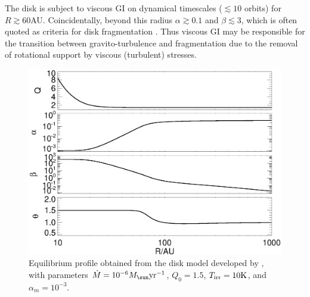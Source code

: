 The disk is subject to viscous GI on dynamical timescales ($\lesssim
10$ orbits) for $R\gtrsim60$AU. Coincidentally, beyond this radius
$\alpha\gtrsim 0.1$ and $\beta\lesssim 3$, which is often quoted as 
criteria for disk fragmentation \citep[e.g.][]{rafikov15}. 
Thus viscous GI may be responsible for the transition between gravito-turbulence
and fragmentation due to the removal of rotational support by viscous (turbulent) stresses.


\begin{figure}
  \includegraphics[width=\linewidth,clip=true,trim=0cm 0cm 0cm
    0.0cm]{figures/ppd_2d_basic}
  \caption{Equilibrium profile obtained from the disk model developed
    by \cite{rafikov15}, with parameters $\dot{M} =
    10^{-6}M_\sun\yr^{-1}$, $Q_0=1.5$, $T_\mathrm{irr}=10\mathrm{K}$, and
    $\alpha_m=10^{-3}$.   
    \label{rafikov_model}}
\end{figure}

